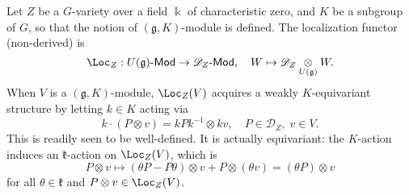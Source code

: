 \documentclass[12pt, a3paper, openany]{book}
\begin{document}
\begin{Example}{}{}
	Let $Z$ be a $G$-variety over a field $\Bbbk$ of characteristic zero, and $K$ be a subgroup of $G$, so that the notion of $(\mathfrak{g}, K)$-module is defined. The localization functor (non-derived) is
	\[ \Loc_Z: U(\mathfrak{g}) \dcate{Mod} \to \mathscr{D}_Z \dcate{Mod}, \quad W \mapsto \mathscr{D}_Z \dotimes{U(\mathfrak{g})} W. \]
	When $V$ is a $(\mathfrak{g}, K)$-module, $\Loc_Z(V)$ acquires a weakly $K$-equivariant structure by letting $k \in K$ acting via
	\[ k \cdot (P \otimes v) = k P k^{-1} \otimes kv, \quad P \in \mathscr{D}_Z, \; v \in V. \]
	This is readily seen to be well-defined. It is actually equivariant: the $K$-action induces an $\mathfrak{k}$-action on $\Loc_Z(V)$, which is
	\[ P \otimes v \mapsto (\theta P - P\theta) \otimes v + P \otimes (\theta v) = (\theta P) \otimes v \]
	for all $\theta \in \mathfrak{k}$ and $P \otimes v \in \Loc_Z(V)$.
\end{Example}
\end{document}
